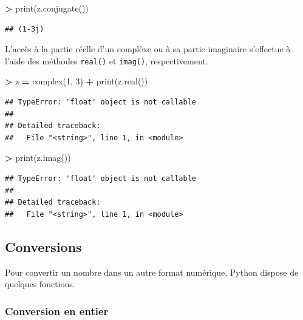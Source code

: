 \documentclass[12pt,]{book}
\newenvironment{Shaded}{\begin{snugshade}}{\end{snugshade}}
\newcommand{\DecValTok}[1]{\textcolor[rgb]{0.00,0.00,0.81}{#1}}
\newcommand{\OperatorTok}[1]{\textcolor[rgb]{0.81,0.36,0.00}{\textbf{#1}}}
\newcommand{\BuiltInTok}[1]{#1}
\newcommand{\NormalTok}[1]{#1}
\numberwithin{equation}{section}
\numberwithin{countremarque}{section}
\begin{document}
\begin{Shaded}
\begin{Highlighting}[]
\OperatorTok{>} \BuiltInTok{print}\NormalTok{(z.conjugate())}
\end{Highlighting}
\end{Shaded}

\begin{lstlisting}
## (1-3j)
\end{lstlisting}

L'accès à la partie réelle d'un complèxe ou à sa partie imaginaire
s'effectue à l'aide des méthodes \texttt{real()} et \texttt{imag()},
respectivement.

\begin{Shaded}
\begin{Highlighting}[]
\OperatorTok{>}\NormalTok{ z }\OperatorTok{=} \BuiltInTok{complex}\NormalTok{(}\DecValTok{1}\NormalTok{, }\DecValTok{3}\NormalTok{)}
\OperatorTok{+} \BuiltInTok{print}\NormalTok{(z.real())}
\end{Highlighting}
\end{Shaded}

\begin{lstlisting}
## TypeError: 'float' object is not callable
## 
## Detailed traceback: 
##   File "<string>", line 1, in <module>
\end{lstlisting}

\begin{Shaded}
\begin{Highlighting}[]
\OperatorTok{>} \BuiltInTok{print}\NormalTok{(z.imag())}
\end{Highlighting}
\end{Shaded}

\begin{lstlisting}
## TypeError: 'float' object is not callable
## 
## Detailed traceback: 
##   File "<string>", line 1, in <module>
\end{lstlisting}

\subsection{Conversions}\label{conversions}

Pour convertir un nombre dans un autre format numérique, Python dispose
de quelques fonctions.

\subsubsection{Conversion en entier}\label{conversion-en-entier}
\end{document}
